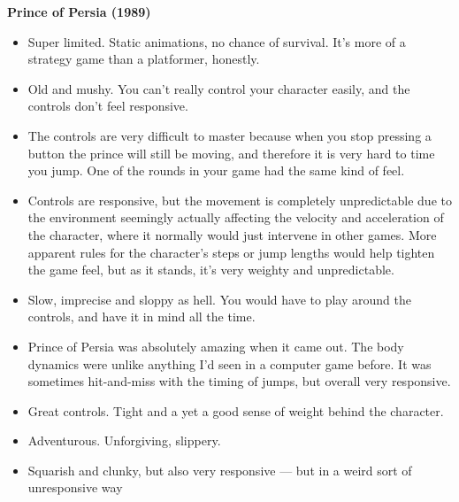 \textbf{Prince of Persia (1989)}
\vspace{-5mm}
\begin{itemize}[noitemsep,nolistsep]
\item Super limited. Static animations, no chance of survival. It's more of a strategy game than a platformer, honestly.
\item Old and mushy. You can't really control your character easily, and the controls don't feel responsive.
\item The controls are very difficult to master because when you stop pressing a button the prince will still be moving, and therefore it is very hard to time you jump. One of the rounds in your game had the same kind of feel.
\item Controls are responsive, but the movement is completely unpredictable due to the environment seemingly actually affecting the velocity and acceleration of the character, where it normally would just intervene in other games. More apparent rules for the character's steps or jump lengths would help tighten the game feel, but as it stands, it's very weighty and unpredictable.
\item Slow, imprecise and sloppy as hell. You would have to play around the controls, and have it in mind all the time.
\item Prince of Persia was absolutely amazing when it came out. The body dynamics were unlike anything I'd seen in a computer game before. It was sometimes hit-and-miss with the timing of jumps, but overall very responsive.
\item Great controls. Tight and a yet a good sense of weight behind the character.
\item Adventurous. Unforgiving, slippery.
\item Squarish and clunky, but also very responsive --- but in a weird sort of unresponsive way
\end{itemize}


